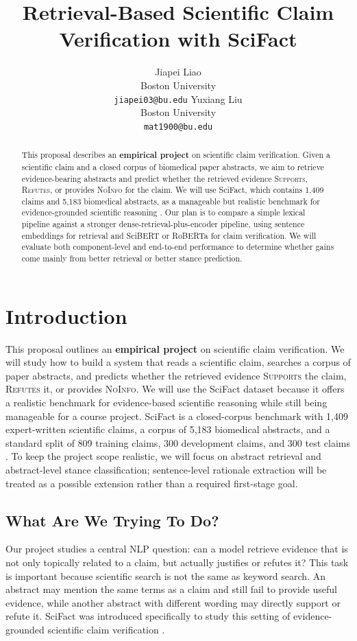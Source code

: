 \documentclass[11pt]{article}
\title{Retrieval-Based Scientific Claim Verification with SciFact}
\author{Jiapei Liao \\
  Boston University \\
  \texttt{jiapei03@bu.edu}
  \And
  Yuxiang Liu \\
  Boston University \\
  \texttt{mat1900@bu.edu}}
\begin{document}
\maketitle

\begin{abstract}
This proposal describes an \textbf{empirical project} on scientific claim verification. Given a scientific claim and a closed corpus of biomedical paper abstracts, we aim to retrieve evidence-bearing abstracts and predict whether the retrieved evidence \textsc{Supports}, \textsc{Refutes}, or provides \textsc{NoInfo} for the claim. We will use SciFact, which contains 1,409 claims and 5,183 biomedical abstracts, as a manageable but realistic benchmark for evidence-grounded scientific reasoning \citep{wadden2020fact}. Our plan is to compare a simple lexical pipeline against a stronger dense-retrieval-plus-encoder pipeline, using sentence embeddings for retrieval and SciBERT or RoBERTa for claim verification. We will evaluate both component-level and end-to-end performance to determine whether gains come mainly from better retrieval or better stance prediction.
\end{abstract}

\section{Introduction}
This proposal outlines an \textbf{empirical project} on scientific claim verification. We will study how to build a system that reads a scientific claim, searches a corpus of paper abstracts, and predicts whether the retrieved evidence \textsc{Supports} the claim, \textsc{Refutes} it, or provides \textsc{NoInfo}. We will use the SciFact dataset because it offers a realistic benchmark for evidence-based scientific reasoning while still being manageable for a course project. SciFact is a closed-corpus benchmark with 1,409 expert-written scientific claims, a corpus of 5,183 biomedical abstracts, and a standard split of 809 training claims, 300 development claims, and 300 test claims \citep{wadden2020fact}. To keep the project scope realistic, we will focus on abstract retrieval and abstract-level stance classification; sentence-level rationale extraction will be treated as a possible extension rather than a required first-stage goal.

\subsection{What Are We Trying To Do?}
Our project studies a central NLP question: can a model retrieve evidence that is not only topically related to a claim, but actually justifies or refutes it? This task is important because scientific search is not the same as keyword search. An abstract may mention the same terms as a claim and still fail to provide useful evidence, while another abstract with different wording may directly support or refute it. SciFact was introduced specifically to study this setting of evidence-grounded scientific claim verification \citep{wadden2020fact}.
\end{document}
